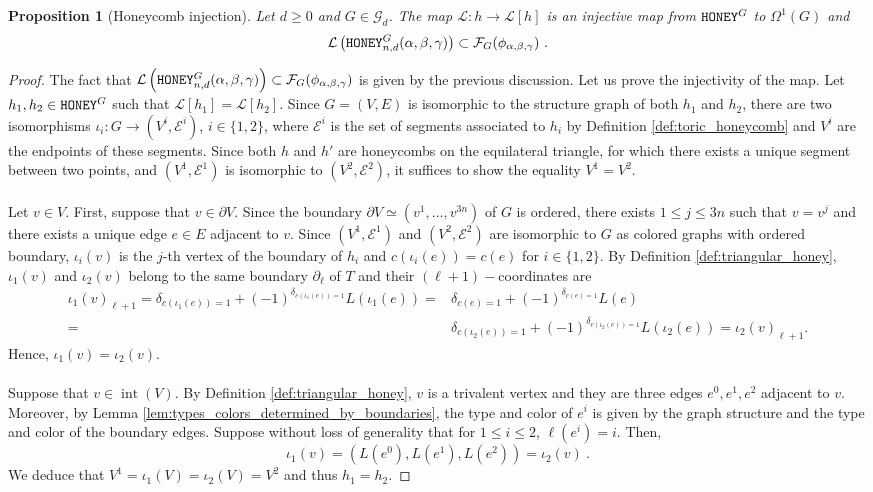 \documentclass[11pt,a4paper]{amsart}
\providecommand{\honey}{\texttt{\textsc{HONEY}}}
\DeclareMathOperator{\interior}{int}
\numberwithin{equation}{section}
\newtheorem{proposition}[theorem]{Proposition}
\theoremstyle{definition}
\begin{document}
\begin{proposition}[Honeycomb injection]
    \label{prop:parametrization_triangular_honey_first}
    Let $d\geqslant 0$ and $G\in \mathcal{G}_d$. 
    The map $\mathcal{L}: h\rightarrow \mathcal{L}[h]$ is an injective 
    map from $\honey^G$ to $\Omega^1(G)$ and 
    $$\mathcal{L} \left(\honey_{n,d}^G(\alpha,\beta,\gamma)\right) 
    \subset  \mathcal{F}_{G}(\phi_{\alpha,\beta,\gamma}) \ .$$
\end{proposition}

\begin{proof}
The fact that $\mathcal{L} \left(\honey_{n,d}^G(\alpha,\beta,\gamma)\right) 
\subset  \mathcal{F}_{G}(\phi_{\alpha,\beta,\gamma})$ is given by the previous discussion. 
Let us prove the injectivity of the map. Let $h_1,h_2\in \honey^G$ such that 
$\mathcal{L}[h_1] = \mathcal{L}[h_2]$. 
Since $G=(V,E)$ is isomorphic to the structure graph of both $h_1$ and $h_2$, 
there are two isomorphisms $\iota_i:G\rightarrow (V^i,\mathcal{E}^i)$, $i\in\{1,2\}$, 
where $\mathcal{E}^i$ is the set of segments associated to $h_i$ 
by Definition \ref{def:toric_honeycomb} and $V^i$ are the endpoints of these segments. 
Since both $h$ and $h'$ are honeycombs on the equilateral triangle, 
for which there exists a unique segment between two points, 
and $(V^1,\mathcal{E}^1)$ is isomorphic to $(V^2,\mathcal{E}^2)$, it suffices to show the equality $V^1 = V^2$. 
\\
\\
Let $v\in V$. First, suppose that $v\in \partial V$. Since the boundary 
$\partial V \simeq (v^1,\ldots,v^{3n})$ 
of $G$ is ordered, there exists $1\leqslant j\leqslant 3n$ such that $v=v^j$ and there exists a 
unique edge $e\in E$ adjacent to $v$. 
Since $(V^1, \mathcal{E}^1)$ and $(V^2,\mathcal{E}^2)$ are isomorphic to $G$ 
as colored graphs with ordered boundary, $\iota_i(v)$ is the $j$-th vertex of the 
boundary of $h_i$ and $c(\iota_i(e))=c(e)$ for $i \in \{1,2\}$. 
By Definition \ref{def:triangular_honey}, $\iota_1(v)$ and $\iota_2(v)$ belong to the 
same boundary $\partial_\ell$ of $T$ and their $(\ell+1)-$coordinates are 
\begin{align*}
\iota_1(v)_{\ell+1}=\delta_{c(\iota_1(e))=1} + (-1)^{\delta_{c(\iota_1(e))=1}} L(\iota_1(e)) 
=&\delta_{c(e)=1}+(-1)^{\delta_{c(e)=1}}L(e)\\
=&\delta_{c(\iota_2(e))=1}+(-1)^{\delta_{c(\iota_2(e))=1}} L(\iota_2(e)) = \iota_2(v)_{\ell+1}.
\end{align*}
Hence, $\iota_1(v) = \iota_2(v)$.
\\
\\
Suppose that $v\in \interior(V)$. By Definition \ref{def:triangular_honey}, 
$v$ is a trivalent vertex 
and they are three edges $e^0,e^1,e^2$ adjacent to $v$. 
Moreover, by Lemma \ref{lem:types_colors_determined_by_boundaries}, 
the type and color of $e^i$ is given by the graph structure and the type 
and color of the boundary edges. 
Suppose without loss of generality that for $1 \leqslant i \leqslant 2$, $\ell(e^i)=i$. Then,
$$\iota_1(v)=(L(e^0),L(e^1),L(e^2))=\iota_2(v) \ .$$
We deduce that $V^1=\iota_1(V) = \iota_2(V)=V^2$ and thus $h_1=h_2$. 
\end{proof}
\end{document}
